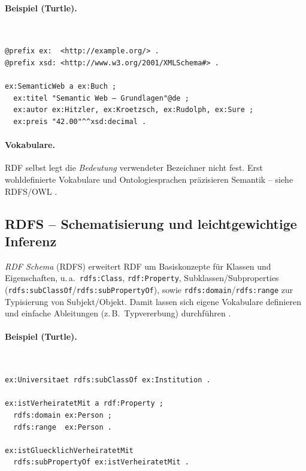 \paragraph{Beispiel (Turtle).}\mbox{}\\[-1.5ex]
\begin{lstlisting}
@prefix ex:  <http://example.org/> .
@prefix xsd: <http://www.w3.org/2001/XMLSchema#> .

ex:SemanticWeb a ex:Buch ;
  ex:titel "Semantic Web – Grundlagen"@de ;
  ex:autor ex:Hitzler, ex:Kroetzsch, ex:Rudolph, ex:Sure ;
  ex:preis "42.00"^^xsd:decimal .
\end{lstlisting}

\paragraph{Vokabulare.} RDF selbst legt die \emph{Bedeutung} verwendeter Bezeichner nicht fest. Erst wohldefinierte Vokabulare und Ontologiesprachen präzisieren Semantik -- siehe RDFS/OWL \cite{Hitzler,AntoniouVanHarmelen}.



\subsection{RDFS -- Schematisierung und leichtgewichtige Inferenz}

\emph{RDF Schema} (RDFS) erweitert RDF um Basiskonzepte für Klassen und Eigenschaften, u.\,a.\ \texttt{rdfs:Class}, \texttt{rdf:Property}, Subklassen/Subproperties (\texttt{rdfs:subClassOf}/\texttt{rdfs:subPropertyOf}), sowie \texttt{rdfs:domain}/\texttt{rdfs:range} zur Typisierung von Subjekt/Objekt. Damit lassen sich eigene Vokabulare definieren und einfache Ableitungen (z.\,B.\ Typvererbung) durchführen \cite{RDFS11,Hitzler}.

\paragraph{Beispiel (Turtle).}\mbox{}\\[-1.5ex]
\begin{lstlisting}
ex:Universitaet rdfs:subClassOf ex:Institution .

ex:istVerheiratetMit a rdf:Property ;
  rdfs:domain ex:Person ;
  rdfs:range  ex:Person .

ex:istGluecklichVerheiratetMit
  rdfs:subPropertyOf ex:istVerheiratetMit .
\end{lstlisting}

